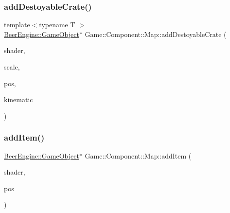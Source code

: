 \mbox{\label{class_game_1_1_component_1_1_map_ab7d5bd531fc73fa3c4697e6d7fd909f2}} 
\subsubsection{\texorpdfstring{add\+Destoyable\+Crate()}{addDestoyableCrate()}}
{\footnotesize\ttfamily template$<$typename T $>$ \\
\mbox{\hyperlink{class_beer_engine_1_1_game_object}{Beer\+Engine\+::\+Game\+Object}}$\ast$ Game\+::\+Component\+::\+Map\+::add\+Destoyable\+Crate (\begin{DoxyParamCaption}\item[{\mbox{\hyperlink{class_beer_engine_1_1_graphics_1_1_shader_program}{Beer\+Engine\+::\+Graphics\+::\+Shader\+Program}} $\ast$}]{shader,  }\item[{glm\+::vec3}]{scale,  }\item[{glm\+::vec3}]{pos,  }\item[{\mbox{\hyperlink{namespace_beer_engine_1_1_component_a2cfe279cc309b6420e792597940b8a33}{Beer\+Engine\+::\+Component\+::\+R\+B\+Type}}}]{kinematic }\end{DoxyParamCaption})\hspace{0.3cm}{\ttfamily [inline]}}

\mbox{\label{class_game_1_1_component_1_1_map_ace1a6fc80c32206aea8ffc382a30e879}} 
\subsubsection{\texorpdfstring{add\+Item()}{addItem()}}
{\footnotesize\ttfamily \mbox{\hyperlink{class_beer_engine_1_1_game_object}{Beer\+Engine\+::\+Game\+Object}}$\ast$ Game\+::\+Component\+::\+Map\+::add\+Item (\begin{DoxyParamCaption}\item[{\mbox{\hyperlink{class_beer_engine_1_1_graphics_1_1_shader_program}{Beer\+Engine\+::\+Graphics\+::\+Shader\+Program}} $\ast$}]{shader,  }\item[{glm\+::vec3}]{pos }\end{DoxyParamCaption})}

